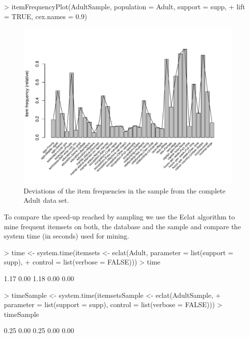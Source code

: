 \documentclass[10pt,a4paper]{article}
\begin{document}
\begin{Schunk}
\begin{Sinput}
> itemFrequencyPlot(AdultSample, population = Adult, support = supp, 
+     lift = TRUE, cex.names = 0.9)
\end{Sinput}
\end{Schunk}
\begin{figure}
\centering
\includegraphics{arules-035}
\caption{Deviations of the item frequencies in the sample from 
the complete Adult data set.}
\label{fig:itemFrequencyPlot3}
\end{figure}

To compare the speed-up reached by sampling we use the Eclat algorithm
to mine frequent itemsets on both, the database and the sample
and compare the system time (in seconds) used for mining.

\begin{Schunk}
\begin{Sinput}
> time <- system.time(itemsets <- eclat(Adult, parameter = list(support = supp), 
+     control = list(verbose = FALSE)))
> time
\end{Sinput}
\begin{Soutput}
[1] 1.17 0.00 1.18 0.00 0.00
\end{Soutput}
\begin{Sinput}
> timeSample <- system.time(itemsetsSample <- eclat(AdultSample, 
+     parameter = list(support = supp), control = list(verbose = FALSE)))
> timeSample
\end{Sinput}
\begin{Soutput}
[1] 0.25 0.00 0.25 0.00 0.00
\end{Soutput}
\end{Schunk}
\end{document}
